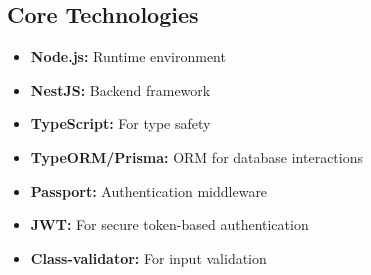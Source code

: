 \documentclass[11pt]{report}
\begin{document}
\subsection{Core Technologies}
\begin{itemize}
    \item \textbf{Node.js:} Runtime environment
    \item \textbf{NestJS:} Backend framework
    \item \textbf{TypeScript:} For type safety
    \item \textbf{TypeORM/Prisma:} ORM for database interactions
    \item \textbf{Passport:} Authentication middleware
    \item \textbf{JWT:} For secure token-based authentication
    \item \textbf{Class-validator:} For input validation
\end{itemize}
\end{document}
